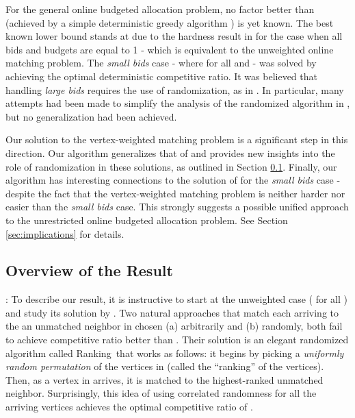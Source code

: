 \documentclass[11pt]{article}
\newcommand{\ranking}{{\sc Ranking}}
\begin{document}
For the general online budgeted allocation problem, no factor better
than  (achieved by a simple deterministic greedy
algorithm \cite{LLN01}) is yet known. The best known lower bound
stands at  due to the hardness result in \cite{KVV90}
for the case when all bids and budgets are equal to 1 - which is
equivalent to the unweighted online matching problem. The \emph{small
  bids} case - where  for all  and  - was solved
by \cite{MSVV05, BJN07} achieving the optimal 
deterministic competitive ratio. It was believed that handling
\emph{large bids} requires the use of randomization, as in
\cite{KVV90}. In particular, many attempts \cite{KV07, BM08, GM08} had
been made to simplify the analysis of the randomized algorithm in
\cite{KVV90}, but no generalization had been achieved.

Our solution to the vertex-weighted matching problem is a significant
step in this direction. Our algorithm generalizes that of \cite{KVV90}
and provides new insights into the role of randomization in these
solutions, as outlined in Section \ref{section:overview}. Finally,
our algorithm has interesting connections to the solution of
\cite{MSVV05} for the \emph{small bids} case - despite the fact that
the vertex-weighted matching problem is neither harder nor easier than
the \emph{small bids} case. This strongly suggests a possible unified
approach to the unrestricted online budgeted allocation problem. See
Section \ref{sec:implications} for details.

\subsection{Overview of the Result}
\label{section:overview}

: To describe our result, it is instructive to start at the unweighted case ( for all ) and study its solution by \cite{KVV90}. Two natural approaches that match each arriving  to the an unmatched neighbor in  chosen (a) arbitrarily and (b) randomly, both fail to achieve competitive ratio better than . Their solution is an elegant randomized algorithm called \ranking~that works as follows: it begins by picking a \emph{uniformly random permutation} of the vertices in  (called the ``ranking'' of the vertices). Then, as a vertex in  arrives, it is matched to the highest-ranked unmatched neighbor. Surprisingly, this idea of using correlated randomness for all the arriving vertices achieves the optimal competitive ratio of .\\
\end{document}
